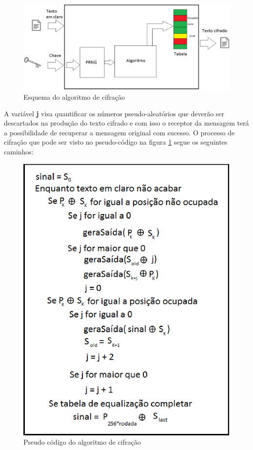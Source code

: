 \begin{figure}[h]
	\centering
	\includegraphics[scale=0.6]{figuras/funcionamento.eps}
	\caption{Esquema do algoritmo de cifração}
\end{figure}

A variável \textbf{j} visa quantificar os números pseudo-aleatórios que deverão ser descartados na produção do texto cifrado e com isso o receptor da mensagem terá a possibilidade de recuperar a mensagem original com sucesso. O processo de cifração que pode ser visto no pseudo-código na figura \ref{pseudo-codigo} segue os seguintes caminhos:

\begin{figure}[h]
	\centering
	\includegraphics[scale=1]{figuras/pseudocondigo.eps}
	\caption{Pseudo código do algoritmo de cifração}
	\label{pseudo-codigo}
\end{figure}

